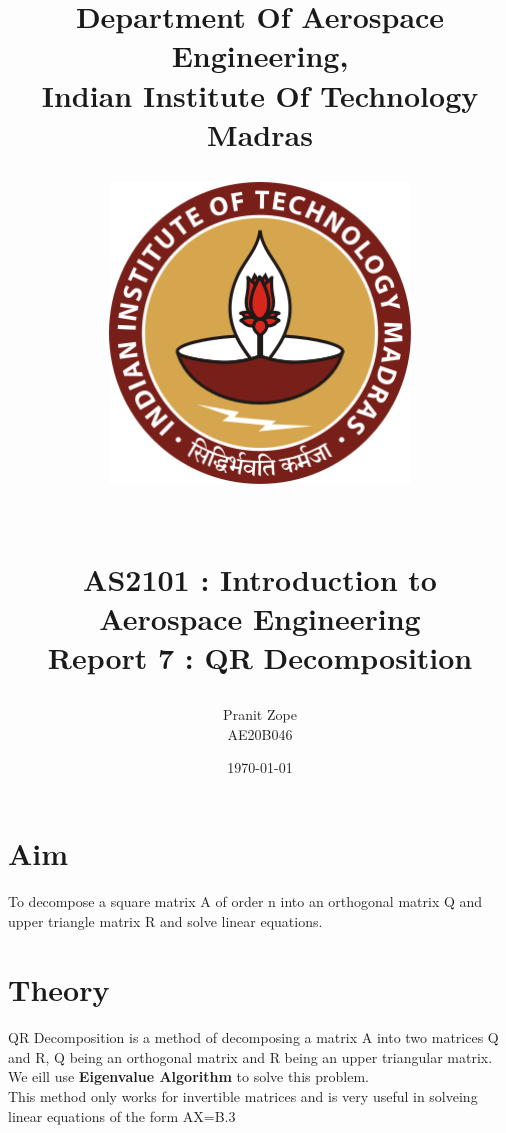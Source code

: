 \documentclass[12pt]{article}
\title{
    Department Of Aerospace Engineering,\\
    Indian Institute Of Technology Madras
    \begin{figure}[H]
        \centering
        \includegraphics[width=8cm]{iitmlogo.png}
    \end{figure}
    \begin{center}
        \textbf{\\AS2101 : Introduction to Aerospace Engineering\\}
        Report 7 : QR Decomposition\\
    \end{center}
}
\author{
    Pranit Zope\\AE20B046
}
\date{\today}
\begin{document}
\maketitle
\newpage
{}
\tableofcontents 
\listoffigures

\newpage
\section{Aim}
To decompose a square matrix A of order n into an orthogonal matrix Q and upper triangle matrix R and solve linear equations.

\section{Theory}
QR Decomposition is a method of decomposing a matrix A into two matrices Q and R,  Q being an orthogonal matrix and R being an upper triangular matrix. We eill use \textbf{Eigenvalue Algorithm} to solve this problem.\\
This method only works for invertible matrices and is very useful in solveing linear equations of the form AX=B.3
\end{document}
